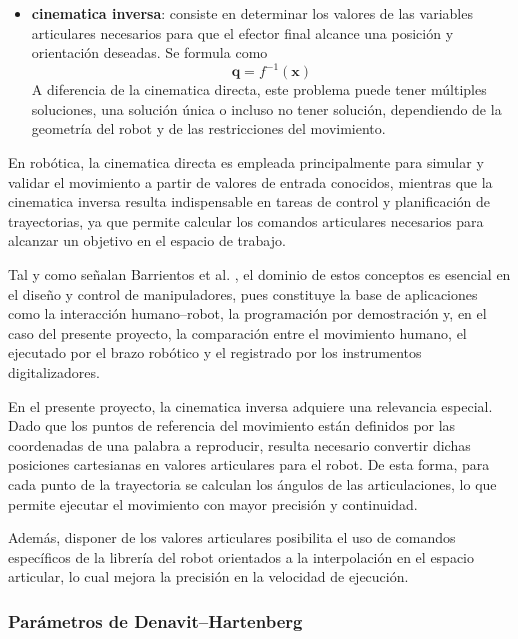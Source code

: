 \documentclass[12pt,a4paper,oneside]{report}
\begin{document}
\begin{itemize}
    \item \textbf{\gls{cinematica} inversa}: consiste en determinar los valores de las
    variables articulares necesarios para que el efector final alcance una
    posición y orientación deseadas. Se formula como
    \begin{equation}
    \mathbf{q} = f^{-1}(\mathbf{x})
    \label{eq:cinematica_inversa}
    \end{equation}
    A diferencia de la \gls{cinematica} directa, este problema puede tener múltiples
    soluciones, una solución única o incluso no tener solución, dependiendo de
    la geometría del \gls{robot} y de las restricciones del movimiento.
\end{itemize}

En robótica, la \gls{cinematica} directa es empleada principalmente para simular y
validar el movimiento a partir de valores de entrada conocidos, mientras que la
\gls{cinematica} inversa resulta indispensable en tareas de control y planificación
de trayectorias, ya que permite calcular los comandos articulares necesarios
para alcanzar un objetivo en el espacio de trabajo.

Tal y como señalan Barrientos et al. \cite{barrientos2014}, el dominio de estos
conceptos es esencial en el diseño y control de manipuladores, pues constituye
la base de aplicaciones como la interacción humano–robot, la programación por
demostración y, en el caso del presente proyecto, la comparación entre el
movimiento humano, el ejecutado por el brazo robótico y el registrado por los
instrumentos digitalizadores.

En el presente proyecto, la \gls{cinematica} inversa adquiere una relevancia
especial. Dado que los puntos de referencia del movimiento están definidos por
las coordenadas de una palabra a reproducir, resulta necesario
convertir dichas posiciones cartesianas en valores articulares para el \gls{robot}.
De esta forma, para cada punto de la trayectoria se calculan los ángulos de
las articulaciones, lo que permite ejecutar el movimiento con mayor precisión
y continuidad.  

Además, disponer de los valores articulares posibilita el uso de comandos
específicos de la librería del \gls{robot} orientados a la interpolación en el
espacio articular, lo cual mejora la precisión en la velocidad de ejecución.


\subsubsection{Parámetros de Denavit–Hartenberg}
\end{document}
